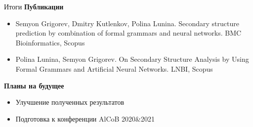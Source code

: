 \documentclass{beamer}
\begin{document}
\begin{frame}{Итоги}
\textbf{Публикации} 

\begin{itemize}
    \item Semyon Grigorev, Dmitry Kutlenkov, Polina Lunina. Secondary structure prediction by combination of formal grammars and neural networks. BMC Bioinformatics, Scopus
    \item Polina Lunina, Semyon Grigorev. On Secondary Structure Analysis by Using Formal Grammars and Artificial Neural Networks. LNBI, Scopus
\end{itemize}
     

\vspace{6mm}

\textbf{Планы на будущее}
\begin{itemize}
    \item Улучшение полученных результатов
    \item Подготовка к конференции AlCoB 2020\&2021
\end{itemize}

\vspace{6mm}

\end{frame}
\end{document}
